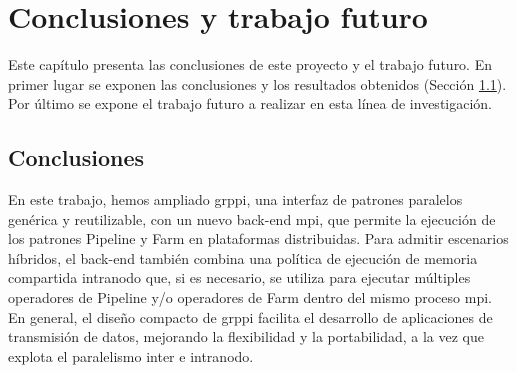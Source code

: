 \chead[]{}
\renewcommand{\headrulewidth}{0.5pt}

\lfoot[]{}
\cfoot[]{}
\rfoot[]{}
\renewcommand{\footrulewidth}{0pt}

\chapter{Conclusiones y trabajo futuro}
\label{ch:conclusiones_trabajo_futuro}

Este capítulo presenta las conclusiones de este proyecto y el trabajo futuro. En primer lugar se exponen las conclusiones y los resultados obtenidos (Sección \ref{sec:conclusiones}). Por último se expone el trabajo futuro a realizar en esta línea de investigación.

\section{Conclusiones}
\label{sec:conclusiones}

En este trabajo, hemos ampliado \acrshort{grppi}, una interfaz de patrones paralelos genérica y reutilizable, con un nuevo back-end \acrshort{mpi}, que permite la ejecución de los patrones Pipeline y Farm en plataformas distribuidas. Para admitir escenarios híbridos, el back-end también combina una política de ejecución de memoria compartida intranodo que, si es necesario, se utiliza para ejecutar múltiples operadores de Pipeline y/o operadores de Farm dentro del mismo proceso \acrshort{mpi}. En general, el diseño compacto de \acrshort{grppi} facilita el desarrollo de aplicaciones de transmisión de datos, mejorando la flexibilidad y la portabilidad, a la vez que explota el paralelismo inter e intranodo.

